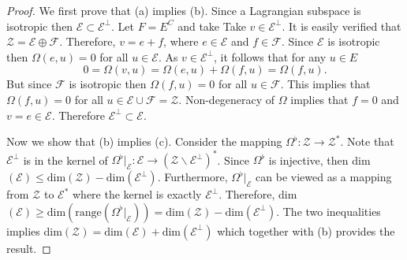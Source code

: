 \begin{proof}
We first prove that (a) implies (b). Since a Lagrangian subspace is isotropic then $\mathcal E \subset \mathcal E^{\perp}$. Let $F = E^C$ and take Take $v \in \mathcal E^{\perp}$. It is easily verified that $\mathcal Z = \mathcal E \oplus\mathcal F$. Therefore, $v = e + f$, where $e \in \mathcal E$ and $f\in \mathcal F$. Since $\mathcal E$ is isotropic then $\Omega(e,u) = 0$ for all $u \in \mathcal E$. As $v\in \mathcal E^{\perp}$, it follows that for any $u\in E$
\begin{equation*}
	0 = \Omega(v,u) = \Omega(e,u) + \Omega(f,u) = \Omega(f,u).
\end{equation*}
But since $\mathcal F$ is isotropic then $\Omega(f,u) = 0$ for all $u \in \mathcal F$. This implies that $\Omega(f,u) = 0$ for all $u\in\mathcal E \cup \mathcal F = \mathcal Z$. Non-degeneracy of $\Omega$ implies that $f=0$ and $v=e\in \mathcal E$. Therefore $\mathcal E^{\perp} \subset \mathcal E$.

Now we show that (b) implies (c). Consider the mapping $\Omega^{\flat}:\mathcal Z \to \mathcal Z^*$. Note that $\mathcal E^{\perp}$ is in the kernel of $\Omega^{\flat}|_{\mathcal E} : \mathcal E \to (\mathcal Z \backslash \mathcal E^{\perp})^*$. Since $\Omega^{\flat}$ is injective, then dim$(\mathcal E) \leq \text{dim}(\mathcal Z) - \text{dim}(\mathcal E^{\perp})$. Furthermore, $\Omega^{\flat}|_{\mathcal E}$ can be viewed as a mapping from $\mathcal Z$ to $\mathcal E^{*}$ where the kernel is exactly $\mathcal E^{\perp}$. Therefore, dim$(\mathcal E) \geq \text{dim}(\text{range}(\Omega^{\flat}|_{\mathcal E})) = \text{dim}(\mathcal{Z}) - \text{dim}(\mathcal E^{\perp})$. The two inequalities implies dim$(\mathcal Z) = \text{dim}(\mathcal E) + \text{dim}(\mathcal E^{\perp})$ which together with (b) provides the result.


\end{proof}
